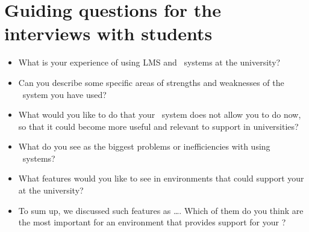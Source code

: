 







\section{Guiding questions for the interviews with students}
\label{sec:appqueststud}
\begin{itemize}
\item What is your experience of using LMS and \ep~systems at the university? 

\item Can you describe some specific areas of strengths and weaknesses of the
\ep~system you have used? 

\item What would you like to do that your \ep~system does not allow you to do
now, so that it could become more useful and relevant to \LLLs support in
universities?

\item What do you see as the biggest problems or inefficiencies with using
\ep~systems?

\item What features would you like to see in environments that could support
your \LLLs at the university?

\item To sum up, we discussed such features as \ldots. Which of them do you
think are the most important for an environment that provides support for your
\LLLsn?
\end{itemize}